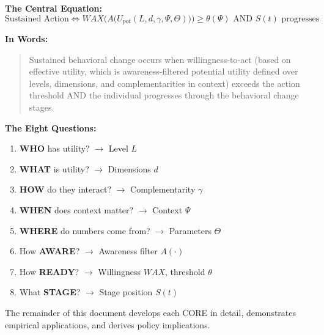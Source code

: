 \begin{tcolorbox}[colback=gray!5!white, colframe=gray!75!black,
    title=\textbf{EBF: The 9C CORE Framework}]

\textbf{The Central Equation:}
\begin{equation}
\text{Sustained Action} \Leftrightarrow WAX\Big(A\big(U_{pot}(L, d, \gamma, \Psi, \Theta)\big)\Big) \geq \theta(\Psi) \text{ AND } S(t) \text{ progresses}
\end{equation}

\textbf{In Words:}
\begin{quote}
Sustained behavioral change occurs when willingness-to-act (based on effective utility, which is
awareness-filtered potential utility defined over levels, dimensions, and
complementarities in context) exceeds the action threshold AND the individual
progresses through the behavioral change stages.
\end{quote}

\textbf{The Eight Questions:}
\begin{enumerate}
\item \textbf{WHO} has utility? $\rightarrow$ Level $L$
\item \textbf{WHAT} is utility? $\rightarrow$ Dimensions $d$
\item \textbf{HOW} do they interact? $\rightarrow$ Complementarity $\gamma$
\item \textbf{WHEN} does context matter? $\rightarrow$ Context $\Psi$
\item \textbf{WHERE} do numbers come from? $\rightarrow$ Parameters $\Theta$
\item How \textbf{AWARE}? $\rightarrow$ Awareness filter $A(\cdot)$
\item How \textbf{READY}? $\rightarrow$ Willingness $WAX$, threshold $\theta$
\item What \textbf{STAGE}? $\rightarrow$ Stage position $S(t)$
\end{enumerate}

\end{tcolorbox}

The remainder of this document develops each CORE in detail, demonstrates
empirical applications, and derives policy implications.

